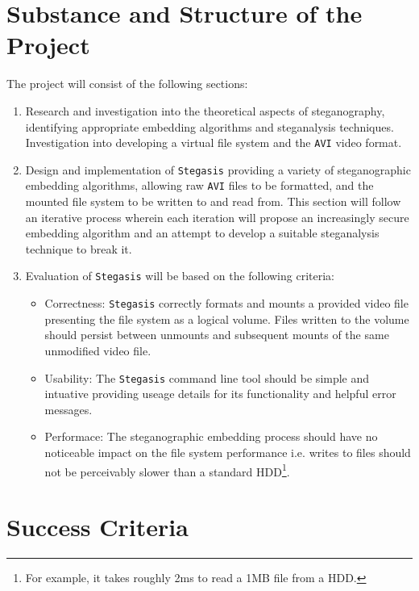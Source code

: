 \documentclass[paper=a4, fontsize=11pt,twoside]{scrartcl}
\numberwithin{table}{section}
\numberwithin{figure}{section}
\numberwithin{algorithm}{section}
\begin{document}
\section*{Substance and Structure of the Project}
The project will consist of the following sections:
\begin{enumerate}
\item Research and investigation into the theoretical aspects of steganography, identifying appropriate embedding algorithms and steganalysis techniques. Investigation into developing a virtual file system and the \texttt{AVI} video format.
\item Design and implementation of \texttt{Stegasis} providing a variety of steganographic embedding algorithms, allowing raw \texttt{AVI} files to be formatted, and the mounted file system to be written to and read from. This section will follow an iterative process wherein each iteration will propose an increasingly secure embedding algorithm and an attempt to develop a suitable steganalysis technique to break it.
\item Evaluation of \texttt{Stegasis} will be based on the following criteria:
    \begin{itemize}
    \item Correctness: \texttt{Stegasis} correctly formats and mounts a provided video file presenting the file system as a logical volume. Files written to the volume should persist between unmounts and subsequent mounts of the same unmodified video file.
    \item Usability: The \texttt{Stegasis} command line tool should be simple and intuative providing useage details for its functionality and helpful error messages.
    \item Performace: The steganographic embedding process should have no noticeable impact on the file system performance i.e. writes to files should not be perceivably slower than a standard HDD\footnote{For example, it takes roughly 2ms to read a 1MB file from a HDD.}.
    \end{itemize}
\end{enumerate}

\section*{Success Criteria}
\end{document}
